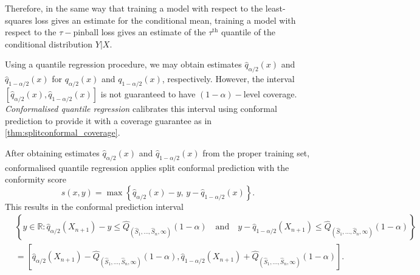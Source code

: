 \documentclass[11pt, titlepage]{article} %
\newcommand{\R}{\mathrm}
\numberwithin{equation}{section}
\theoremstyle{definition}
\numberwithin{theorem}{section}
\numberwithin{lemma}{section}
\numberwithin{corollary}{section}
\numberwithin{proposition}{section}
\numberwithin{definition}{section}
\numberwithin{remark}{section}
\begin{document}
\noindent
Therefore, in the same way that training a model with respect to the least-squares loss gives an estimate for the conditional mean, training a model with respect to the \(\tau-\)pinball loss gives an estimate of the \(\tau^{\R{th}}\) quantile of the conditional distribution \(Y|X\). \vskip5pt

\noindent
Using a quantile regression procedure, we may obtain estimates \(\hat{q}_{\alpha/2}(x)\) and \(\hat{q}_{1-\alpha/2}(x)\) for \(q_{\alpha/2}(x)\) and \(q_{1-\alpha/2}(x)\), respectively. However, the interval \([\hat{q}_{\alpha/2}(x), \hat{q}_{1-\alpha/2}(x)]\) is not guaranteed to have \((1-\alpha)-\)level coverage. \textit{Conformalised quantile regression} \cite{romano2019_CQR} calibrates this interval using conformal prediction to provide it with a coverage guarantee as in \cref{thm:splitconformal_coverage}. \vskip5pt

\noindent
After obtaining estimates \(\hat{q}_{\alpha/2}(x)\) and \(\hat{q}_{1-\alpha/2}(x)\) from the proper training set, conformalised quantile regression applies split conformal prediction with the conformity score \[
    \hat{s}(x,y) = \max\left\{ \hat{q}_{\alpha/2}(x) - y, \, y - \hat{q}_{1-\alpha/2}(x) \right\}.
\] This results in the conformal prediction interval \begin{align*}
    &\left\{ y \in \mathbb{R}: \hat{q}_{\alpha/2}(X_{n+1}) - y \leq \hat{Q}_{(\hat{S}_1, \ldots, \hat{S}_n, \infty)}(1-\alpha) \quad \R{and} \quad y - \hat{q}_{1-\alpha/2}(X_{n+1}) \leq \hat{Q}_{(\hat{S}_1, \ldots, \hat{S}_n, \infty)}(1-\alpha) \right\} \\
    &= \left[\hat{q}_{\alpha/2}(X_{n+1}) - \hat{Q}_{(\hat{S}_1, \ldots, \hat{S}_n, \infty)}(1-\alpha), \hat{q}_{1-\alpha/2}(X_{n+1}) + \hat{Q}_{(\hat{S}_1, \ldots, \hat{S}_n, \infty)}(1-\alpha)  \right].
\end{align*}
\end{document}
